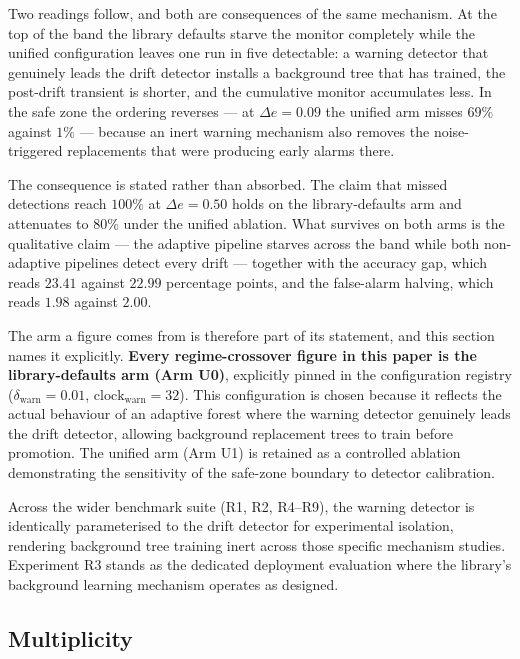Two readings follow, and both are consequences of the same mechanism. At the top of the band the
library defaults starve the monitor completely while the unified configuration leaves one run in
five detectable: a warning detector that genuinely leads the drift detector installs a background
tree that has trained, the post-drift transient is shorter, and the cumulative monitor accumulates
less. In the safe zone the ordering reverses --- at $\Delta e = 0.09$ the unified arm misses $69\%$
against $1\%$ --- because an inert warning mechanism also removes the noise-triggered replacements
that were producing early alarms there.

The consequence is stated rather than absorbed. The claim that missed detections reach $100\%$ at
$\Delta e = 0.50$ holds on the library-defaults arm and attenuates to $80\%$ under the unified
ablation. What survives on both arms is the qualitative claim --- the adaptive pipeline starves
across the band while both non-adaptive pipelines detect every drift --- together with the accuracy
gap, which reads $23.41$ against $22.99$ percentage points, and the false-alarm halving, which reads
$1.98$ against $2.00$.

The arm a figure comes from is therefore part of its statement, and this section names it explicitly.
\textbf{Every regime-crossover figure in this paper is the library-defaults arm (Arm U0)},
explicitly pinned in the configuration registry ($\delta_{\mathrm{warn}} = 0.01$,
$\mathrm{clock}_{\mathrm{warn}} = 32$). This configuration is chosen because it reflects the actual
behaviour of an adaptive forest where the warning detector genuinely leads the drift detector,
allowing background replacement trees to train before promotion. The unified arm (Arm U1) is
retained as a controlled ablation demonstrating the sensitivity of the safe-zone boundary to detector
calibration.

Across the wider benchmark suite (R1, R2, R4--R9), the warning detector is identically parameterised
to the drift detector for experimental isolation, rendering background tree training inert across
those specific mechanism studies. Experiment R3 stands as the dedicated deployment evaluation where
the library's background learning mechanism operates as designed.

\subsection{Multiplicity}\label{sec:protocol_multiplicity}

